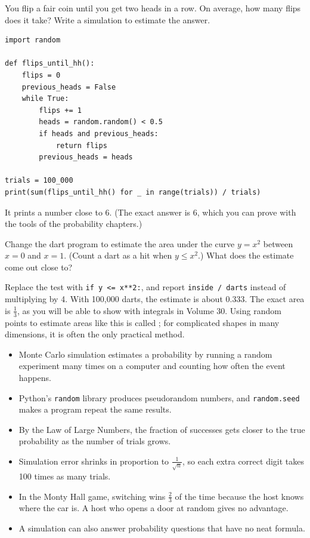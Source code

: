 \begin{Exercise}[title={Two Heads in a Row}, label=mc_hh]
You flip a fair coin until you get two heads in a row. On average, how many flips does
it take? Write a simulation to estimate the answer.
\end{Exercise}
\begin{Answer}[ref=mc_hh]
\begin{verbatim}
import random

def flips_until_hh():
    flips = 0
    previous_heads = False
    while True:
        flips += 1
        heads = random.random() < 0.5
        if heads and previous_heads:
            return flips
        previous_heads = heads

trials = 100_000
print(sum(flips_until_hh() for _ in range(trials)) / trials)
\end{verbatim}
It prints a number close to 6. (The exact answer is 6, which you can prove with the
tools of the probability chapters.)
\end{Answer}

\begin{Exercise}[title={Area by Darts}, label=mc_area]
Change the dart program to estimate the area under the curve $y = x^2$ between
$x = 0$ and $x = 1$. (Count a dart as a hit when $y \leq x^2$.) What does the estimate
come out close to?
\end{Exercise}
\begin{Answer}[ref=mc_area]
Replace the test with \texttt{if y <= x**2:}, and report
\texttt{inside / darts} instead of multiplying by 4. With 100,000 darts,
the estimate is about 0.333. The exact area is $\frac{1}{3}$, as you will be able to
show with integrals in Volume 30. Using random points to estimate areas like this is
called ; for complicated shapes in many dimensions, it is
often the only practical method.
\end{Answer}

\begin{mdframed}[style=important, frametitle={Key Ideas}]
\begin{itemize}
\item Monte Carlo simulation estimates a probability by running a random experiment many times on a computer and counting how often the event happens.
\item Python's \texttt{random} library produces pseudorandom numbers, and \texttt{random.seed} makes a program repeat the same results.
\item By the Law of Large Numbers, the fraction of successes gets closer to the true probability as the number of trials grows.
\item Simulation error shrinks in proportion to $\frac{1}{\sqrt{n}}$, so each extra correct digit takes 100 times as many trials.
\item In the Monty Hall game, switching wins $\frac{2}{3}$ of the time because the host knows where the car is. A host who opens a door at random gives no advantage.
\item A simulation can also answer probability questions that have no neat formula.
\end{itemize}
\end{mdframed}

